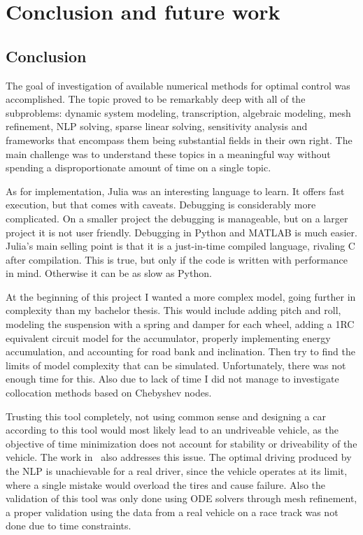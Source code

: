 \chapter{Conclusion and future work}
\section{Conclusion}
\setlength{\parindent}{2em}
\raggedbottom
The goal of investigation of available numerical methods for optimal control was accomplished. The topic proved to be remarkably deep with all of the subproblems: dynamic system modeling, transcription, algebraic modeling, mesh refinement, NLP solving, sparse linear solving, sensitivity analysis and frameworks that encompass them being substantial fields in their own right. The main challenge was to understand these topics in a meaningful way without spending a disproportionate amount of time on a single topic.

As for implementation, Julia was an interesting language to learn. It offers fast execution, but that comes with caveats. Debugging is considerably more complicated. On a smaller project the debugging is manageable, but on a larger project it is not user friendly. Debugging in Python and MATLAB is much easier. Julia's main selling point is that it is a just-in-time compiled language, rivaling C after compilation. This is true, but only if the code is written with performance in mind. Otherwise it can be as slow as Python.

At the beginning of this project I wanted a more complex model, going further in complexity than my bachelor thesis. This would include adding pitch and roll, modeling the suspension with a spring and damper for each wheel, adding a 1RC equivalent circuit model for the accumulator, properly implementing energy accumulation, and accounting for road bank and inclination. Then try to find the limits of model complexity that can be simulated. Unfortunately, there was not enough time for this. Also due to lack of time I did not manage to investigate collocation methods based on Chebyshev nodes.

Trusting this tool completely, not using common sense and designing a car according to this tool would most likely lead to an undriveable vehicle, as the objective of time minimization does not account for stability or driveability of the vehicle. The work in~\cite{perantoniOptimalControlFormula2014} also addresses this issue. The optimal driving produced by the NLP is unachievable for a real driver, since the vehicle operates at its limit, where a single mistake would overload the tires and cause failure. Also the validation of this tool was only done using ODE solvers through mesh refinement, a proper validation using the data from a real vehicle on a race track was not done due to time constraints.

